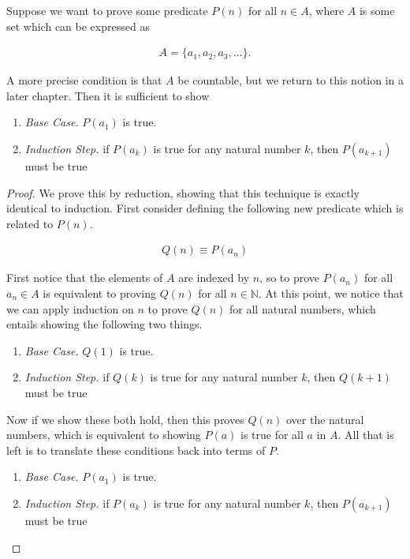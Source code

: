 \vspace{\baselineskip}
\begin{theorem}
	Suppose we want to prove some predicate $P(n)$ for all $n \in A$, where $A$ is some set which can be expressed as
	
	\begin{align*}
		A = \{ a_1, a_2, a_3, \dots \}.
	\end{align*}
	
	A more precise condition is that $A$ be countable, but we return to this notion in a later chapter. Then it is sufficient to show
	\vspace{\baselineskip}
	\begin{enumerate}
		\item \emph{Base Case.} $P(a_1)$ is true.
		\item \emph{Induction Step.} if $P(a_k)$ is true for any natural number $k$, then $P(a_{k + 1})$ must be true
	\end{enumerate}
\end{theorem}
\begin{proof}
	We prove this by reduction, showing that this technique is exactly identical to induction. First consider defining the following new predicate which is related to $P(n)$.
	
	\begin{align*}
		Q(n) \equiv P(a_n)
	\end{align*}
	
	First notice that the elements of $A$ are indexed by $n$, so to prove $P(a_n)$ for all $a_n \in A$ is equivalent to proving $Q(n)$ for all $n \in \mathbb{N}$. At this point, we notice that we can apply induction on $n$ to prove $Q(n)$ for all natural numbers, which entails showing the following two things.
	
	\vspace{\baselineskip}
	\begin{enumerate}
		\item \emph{Base Case.} $Q(1)$ is true.
		\item \emph{Induction Step.} if $Q(k)$ is true for any natural number $k$, then $Q(k + 1)$ must be true
	\end{enumerate}
	\vspace{\baselineskip}
	
	Now if we show these both hold, then this proves $Q(n)$ over the natural numbers, which is equivalent to showing $P(a)$ is true for all $a$ in $A$. All that is left is to translate these conditions back into terms of $P$.
	
	\vspace{\baselineskip}
	\begin{enumerate}
		\item \emph{Base Case.} $P(a_1)$ is true.
		\item \emph{Induction Step.} if $P(a_k)$ is true for any natural number $k$, then $P(a_{k + 1})$ must be true
	\end{enumerate}
\end{proof}
